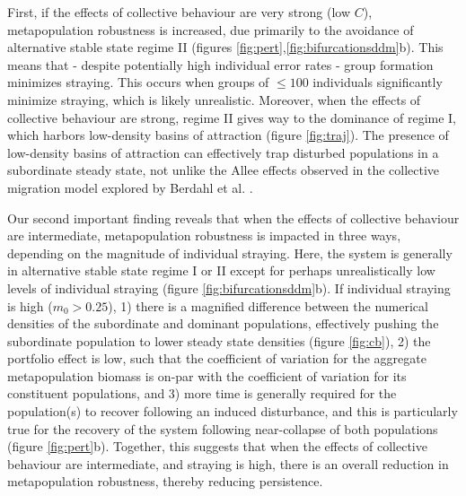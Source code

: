 \documentclass{revtex4}
\begin{document}
First, if the effects of collective behaviour are very strong (low $C$), metapopulation robustness is increased, due primarily to the avoidance of alternative stable state regime II (figures \ref{fig:pert},\ref{fig:bifurcationsddm}b).
This means that - despite potentially high individual error rates - group formation minimizes straying. 
This occurs when groups of $\leq 100$ individuals significantly minimize straying, which is likely unrealistic.
Moreover, when the effects of collective behaviour are strong, regime II gives way to the dominance of regime I, which harbors low-density basins of attraction (figure \ref{fig:traj}).
The presence of low-density basins of attraction can effectively trap disturbed populations in a subordinate steady state, not unlike the Allee effects observed in the collective migration model explored by Berdahl et al. \citep{Berdahl:2016dx}.


Our second important finding reveals that when the effects of collective behaviour are intermediate, metapopulation robustness is impacted in three ways, depending on the magnitude of individual straying.
Here, the system is generally in alternative stable state regime I or II except for perhaps unrealistically low levels of individual straying (figure \ref{fig:bifurcationsddm}b).
If individual straying is high ($m_0>0.25$),
1) there is a magnified difference between the numerical densities of the subordinate and dominant populations, effectively pushing the subordinate population to lower steady state densities (figure \ref{fig:cb}),
2) the portfolio effect is low, such that the coefficient of variation for the aggregate metapopulation biomass is on-par with the coefficient of variation for its constituent populations, and
3) more time is generally required for the population(s) to recover following an induced disturbance, and this is particularly true for the recovery of the system following near-collapse of both populations (figure \ref{fig:pert}b).
Together, this suggests that when the effects of collective behaviour are intermediate, and straying is high, there is an overall reduction in metapopulation robustness, thereby reducing persistence.
\end{document}
